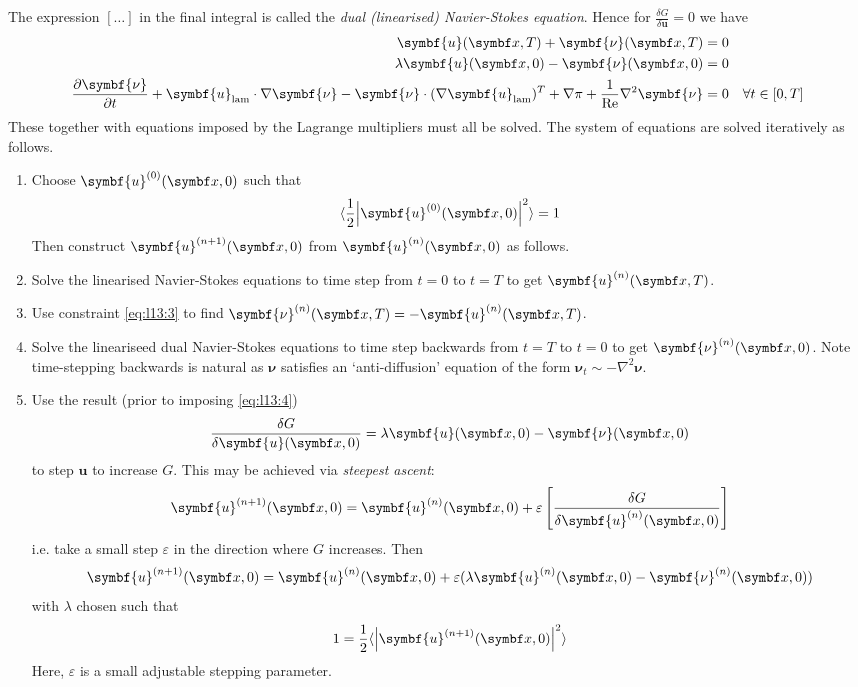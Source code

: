 \documentclass{jknotes}
\renewcommand{\u}{\symbf{u}}
\newcommand{\ReN}{\text{Re}}
\newcommand{\veps}{\varepsilon}
\begin{document}
The expression $\left[\dots\right]$ in the final integral is called the
\emph{dual (linearised) Navier-Stokes equation}. Hence for $\frac{\delta
G}{\delta \u} = 0$ we have
\begin{align}
	\u(\x, T) + \symbf{\nu}(\x, T) &= 0 \label{eq:l13:3} \\
	\lambda \u(\x, 0) - \symbf{\nu}(\x, 0) &= 0 \label{eq:l13:4}\\
	\frac{\partial \symbf{\nu}}{\partial t} + \u_{\text{lam}} \cdot \nabla
	\symbf{\nu} - \symbf{\nu} \cdot (\nabla \u_{\text{lam}})^T + \nabla \pi +
	\frac{1}{\ReN} \nabla^2 \symbf{\nu} &= 0 \hspace{1em}\forall t \in
	\left[0,T\right] \label{eq:l13:5}
\end{align}
These together with equations imposed by the Lagrange multipliers must all be
solved. The system of equations are solved iteratively as follows.
\begin{enumerate}
	\item Choose $\u^{(0)}(\x, 0)$ such that 
		\begin{equation}
			\langle \frac{1}{2}\abs{\u^{(0)}(\x, 0)}^2\rangle = 1
		\end{equation}
		Then construct $\u^{(n+1)}(\x,0)$ from $\u^{(n)}(\x,0)$ as follows.
	\item Solve the linearised Navier-Stokes equations to time step from $t=0$
		to $t=T$ to get $\u^{(n)}(\x,T)$.
	\item Use constraint \eqref{eq:l13:3} to find $\symbf{\nu}^{(n)}(\x,T) =
		-\u^{(n)}(\x, T)$.
	\item Solve the lineariseed dual Navier-Stokes equations to time step
		backwards from $t=T$ to $t=0$ to get $\symbf{\nu}^{(n)}(\x,0)$. Note
		time-stepping backwards is natural as $\symbf{\nu}$ satisfies an
		`anti-diffusion' equation of the form $\symbf{\nu}_t \sim -\nabla^2
		\symbf{\nu}$.
	\item Use the result (prior to imposing \eqref{eq:l13:4})
		\begin{equation}
			\frac{\delta G}{\delta \u(\x,0)} = \lambda
			\u(\x,0) - \symbf{\nu}(\x, 0)
		\end{equation}
		to step $\u$ to increase $G$. This may be achieved via \emph{steepest
		ascent}:
		\begin{equation}
			\u^{(n+1)}(\x,0) = \u^{(n)}(\x,0) + \veps \left[ \frac{\delta
			G}{\delta \u^{(n)}(\x,0)}\right]
		\end{equation}
		i.e. take a small step $\veps$ in the direction where $G$ increases.
		Then
		\begin{equation}
			\u^{(n+1)}(\x,0) = \u^{(n)}(\x,0) + \veps(\lambda \u^{(n)}(\x,0) -
			\symbf{\nu}^{(n)}(\x,0))
		\end{equation}
		with $\lambda$ chosen such that 
		\begin{equation}
			 1 = \frac{1}{2}\langle \abs{\u^{(n+1)}(\x,0)}^2\rangle
		 \end{equation}
		 Here, $\veps$ is a small adjustable stepping parameter.
\end{enumerate}
\end{document}
